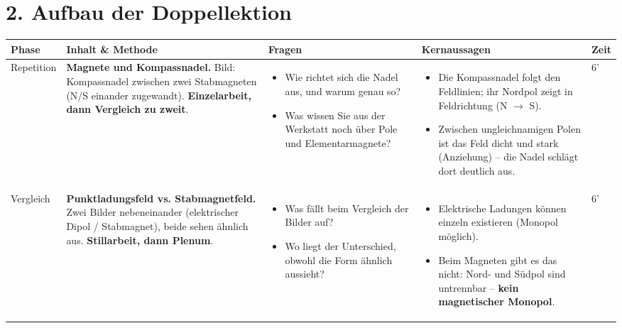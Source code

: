 \documentclass[11pt,a4paper]{article}
\newcommand{\Methode}[1]{{\small\color{groupteal}\textbf{#1}}}
\begin{document}
\section*{2. Aufbau der Doppellektion}

\begin{xltabular}{\textwidth}{@{}Y{2.1cm} Y{6.6cm} Y{6.6cm} Y{6.6cm} p{1.1cm}@{}}
\toprule
\textbf{Phase} & \textbf{Inhalt \& Methode} & \textbf{Fragen} & \textbf{Kernaussagen} & \textbf{Zeit} \\
\midrule
\endhead

Repetition &
\textbf{Magnete und Kompassnadel.} Bild: Kompassnadel zwischen zwei
Stabmagneten (N/S einander zugewandt). \Methode{Einzelarbeit, dann
Vergleich zu zweit}. &
\begin{itemize}
  \item Wie richtet sich die Nadel aus, und warum genau so?
  \item Was wissen Sie aus der Werkstatt noch über Pole und
  Elementarmagnete?
\end{itemize} &
\begin{itemize}
  \item Die Kompassnadel folgt den Feldlinien; ihr Nordpol zeigt in
  Feldrichtung (N $\to$ S).
  \item Zwischen ungleichnamigen Polen ist das Feld dicht und stark
  (Anziehung) -- die Nadel schlägt dort deutlich aus.
\end{itemize} &
6' \\[0.6em]

Vergleich &
\textbf{Punktladungsfeld vs. Stabmagnetfeld.} Zwei Bilder nebeneinander
(elektrischer Dipol / Stabmagnet), beide sehen ähnlich aus.
\Methode{Stillarbeit, dann Plenum}. &
\begin{itemize}
  \item Was fällt beim Vergleich der Bilder auf?
  \item Wo liegt der Unterschied, obwohl die Form ähnlich aussieht?
\end{itemize} &
\begin{itemize}
  \item Elektrische Ladungen können einzeln existieren (Monopol möglich).
  \item Beim Magneten gibt es das nicht: Nord- und Südpol sind
  untrennbar -- \textbf{kein magnetischer Monopol}.
\end{itemize} &
6' \\[0.6em]


\end{xltabular}
\end{document}
